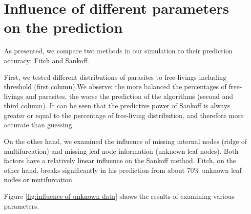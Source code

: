   \section{Influence of different parameters on the prediction}
    As presented, we compare two methods in our simulation to their prediction accuracy: Fitch and 
      Sankoff.

    First, we tested different distributions of parasites to free-livings including threshold (first 
      column).We observe: the more balanced the percentages of free-livings and parasites, the worse 
      the prediction of the algorithms (second and third column). It can be seen that the predictive 
      power of Sankoff is always greater or equal to the percentage of free-living distribution, and 
      therefore more accurate than guessing.

    On the other hand, we examined the influence of missing internal nodes (ridge of multifurcation) 
      and missing leaf node information (unknown leaf nodes). Both factors have a relatively linear 
      influence on the Sankoff method. Fitch, on the other hand, breaks significantly in his 
      prediction from about 70\% unknown leaf nodes or mutifurcation.

    Figure \ref{fig:influence of unknown data} shows the results of examining various parameters.

